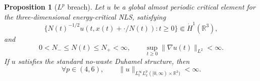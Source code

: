 \documentclass[10pt,a4paper]{amsart}
\numberwithin{equation}{section}
\newtheorem{proposition}[theorem]{Proposition}
\newcommand{\R}{\mathbb R}
\begin{document}
\begin{proposition}[$L^p$ breach]\label{prop:Lp-breach}
Let $u$ be a global almost periodic critical element for the three-dimensional energy-critical NLS, satisfying
\begin{equation*}
  \{N(t)^{-1/2}u(t,x(t)+\cdot/N(t)):t\ge0\}
  \Subset\dot H^1(\R^3),
\end{equation*}
and
\begin{equation*}
  0<N_-\le N(t)\le N_+<\infty,
  \qquad \sup_{t\ge0}\|\nabla u(t)\|_{L^2}<\infty.
\end{equation*}
If $u$ satisfies the standard no-waste Duhamel structure, then
\begin{equation*}
  \forall p\in(4,6),
  \qquad \|u\|_{L_t^\infty L_x^p([0,\infty)\times\R^3)}<\infty.
\end{equation*}
\end{proposition}
\end{document}

